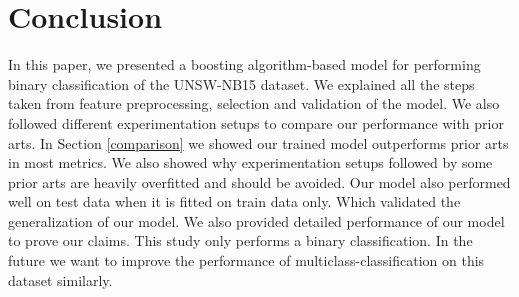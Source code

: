 \documentclass[14pt, conference]{IEEEtran}
\begin{document}
\section{Conclusion \label{conclusion}}
In this paper, we presented a boosting algorithm-based model for performing binary classification of the UNSW-NB15 dataset.
We explained all the steps taken from feature preprocessing, selection and validation of the model. We also
followed different experimentation setups to compare our performance with prior arts. In Section \ref{comparison} we
showed our trained model outperforms prior arts in most metrics. We also showed why experimentation setups followed by
some prior arts are heavily overfitted and should be avoided. Our model also performed well on test data when
it is fitted on train data only. Which validated the generalization of our model.  We also provided detailed performance
 of our model to prove our claims. This study only performs a binary classification. In the future we want to improve
 the performance of multiclass-classification on this dataset similarly.



\end{document}
